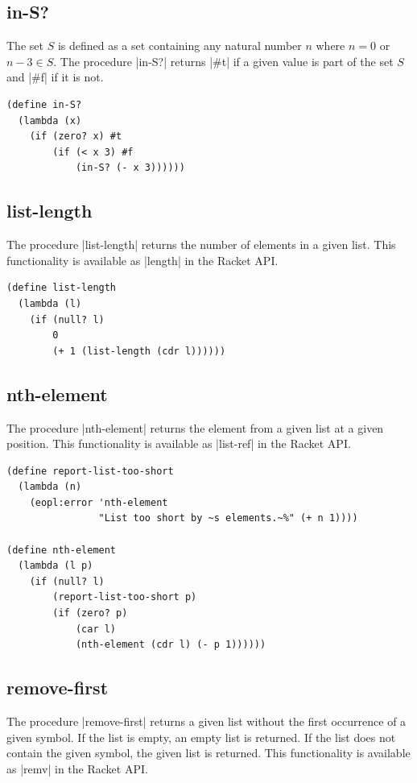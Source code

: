 \documentclass[a4paper]{article}
\begin{document}
\subsection{in-S?}

The set $S$ is defined as a set containing any natural number $n$ where $n = 0$ or $n - 3 \in S$. The procedure |in-S?| returns |#t| if a given value is part of the set $S$ and |#f| if it is not.

\begin{lstlisting}
(define in-S?
  (lambda (x)
    (if (zero? x) #t
        (if (< x 3) #f
            (in-S? (- x 3))))))
\end{lstlisting}

\subsection{list-length}

The procedure |list-length| returns the number of elements in a given list. This functionality is available as |length| in the Racket API.

\begin{lstlisting}
(define list-length
  (lambda (l)
    (if (null? l)
        0
        (+ 1 (list-length (cdr l))))))
\end{lstlisting}

\subsection{nth-element}

The procedure |nth-element| returns the element from a given list at a given position. This functionality is available as |list-ref| in the Racket API.

\begin{lstlisting}
(define report-list-too-short
  (lambda (n)
    (eopl:error 'nth-element
                "List too short by ~s elements.~%" (+ n 1))))

(define nth-element
  (lambda (l p)
    (if (null? l)
        (report-list-too-short p)
        (if (zero? p)
            (car l)
            (nth-element (cdr l) (- p 1))))))
\end{lstlisting}

\subsection{remove-first}

The procedure |remove-first| returns a given list without the first occurrence of a given symbol. If the list is empty, an empty list is returned. If the list does not contain the given symbol, the given list is returned. This functionality is available as |remv| in the Racket API.
\end{document}
